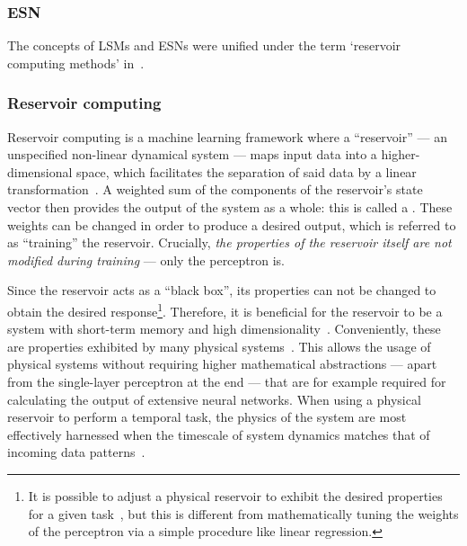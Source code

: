 \subsubsection{ESN}
The concepts of LSMs and ESNs were unified under the term `reservoir computing methods' in~\cite{RC_unification}.
\subsubsection{Reservoir computing}
Reservoir computing is a machine learning framework where a ``reservoir'' --- an unspecified non-linear dynamical system --- maps input data into a higher-dimensional space, which facilitates the separation of said data by a linear transformation~\cite{KUR-24}.
A weighted sum of the components of the reservoir's state vector then provides the output of the system as a whole: this is called a .
These weights can be changed in order to produce a desired output, which is referred to as ``training'' the reservoir.
Crucially, \textit{the properties of the reservoir itself are not modified during training} --- only the perceptron is. \par
Since the reservoir acts as a ``black box'', its properties can not be changed to obtain the desired response\footnote{
	It is possible to adjust a physical reservoir to exhibit the desired properties for a given task~\cite{AdaptiveProgrammableRC,gartside2022reconfigurable}, but this is different from mathematically tuning the weights of the perceptron via a simple procedure like linear regression.
}.
Therefore, it is beneficial for the reservoir to be a system with short-term memory and high dimensionality~\cite{NeuromorphicAFMspintronics,RC_RecentAdvances}.
Conveniently, these are properties exhibited by many physical systems~\cite{RC_DipoleNanomagnets,RC_PassiveFrustratedNM,RC_ASI,RC_RecentAdvances,NeuromorphicOscillators,VowelRecognition4STO,RC_DiffusiveMemristors,RC_MemristorTemporal,gartside2022reconfigurable}.
This allows the usage of physical systems without requiring higher mathematical abstractions --- apart from the single-layer perceptron at the end --- that are for example required for calculating the output of extensive neural networks.
When using a physical reservoir to perform a temporal task, the physics of the system are most effectively harnessed when the timescale of system dynamics matches that of incoming data patterns~\cite{KUR-24}.

